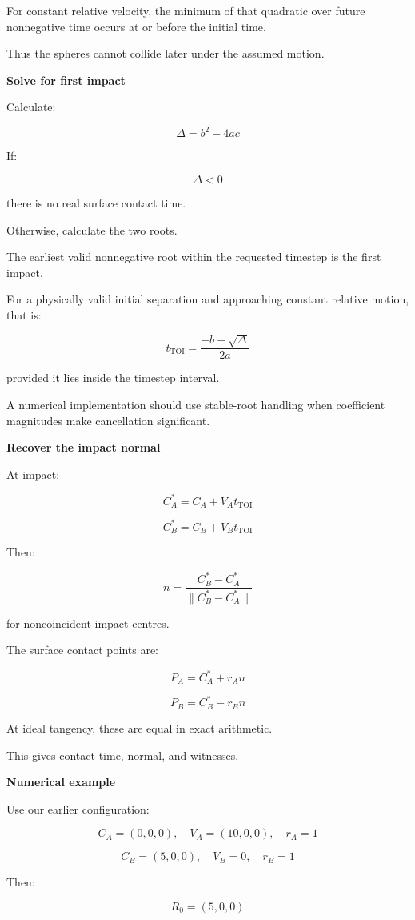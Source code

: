 For constant relative velocity, the minimum of that quadratic over future nonnegative time occurs at or before the initial time.

Thus the spheres cannot collide later under the assumed motion.

\textbf{Solve for first impact}

Calculate:

\[
\Delta=b^2-4ac
\]

If:

\[
\Delta<0
\]

there is no real surface contact time.

Otherwise, calculate the two roots.

The earliest valid nonnegative root within the requested timestep is the first impact.

For a physically valid initial separation and approaching constant relative motion, that is:

\[
\boxed{ t_{\mathrm{TOI}}= \frac{-b-\sqrt{\Delta}}{2a} }
\]

provided it lies inside the timestep interval.

A numerical implementation should use stable-root handling when coefficient magnitudes make cancellation significant.

\textbf{Recover the impact normal}

At impact:

\[
C_A^*=C_A+V_At_{\mathrm{TOI}}
\]

\[
C_B^*=C_B+V_Bt_{\mathrm{TOI}}
\]

Then:

\[
\boxed{ n=\frac{C_B^*-C_A^*} {\|C_B^*-C_A^*\|} }
\]

for noncoincident impact centres.

The surface contact points are:

\[
\boxed{ P_A=C_A^*+r_An }
\]

\[
\boxed{ P_B=C_B^*-r_Bn }
\]

At ideal tangency, these are equal in exact arithmetic.

This gives contact time, normal, and witnesses.

\textbf{Numerical example}

Use our earlier configuration:

\[
C_A=(0,0,0),\quad V_A=(10,0,0),\quad r_A=1
\]

\[
C_B=(5,0,0),\quad V_B=0,\quad r_B=1
\]

Then:

\[
R_0=(5,0,0)
\]

